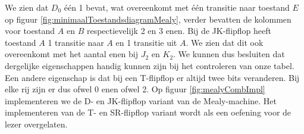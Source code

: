 \begin{table}[hbt]
\centering
{}
\caption{Implementatie van de Mealy-schakeling met verschillende soorten flipflops.}
\end{table}
We zien dat $D_0$ \'e\'en 1 bevat, wat overeenkomt met \'e\'en transitie naar toestand $E$ op figuur \ref{fig:minimaalToestandsdiagramMealy}, verder bevatten de kolommen voor toestand $A$ en $B$ respectievelijk 2 en 3 enen. Bij de JK-flipflop heeft toestand $A$ 1 transitie naar $A$ en 1 transitie uit $A$. We zien dat dit ook overeenkomt met het aantal enen bij $J_2$ en $K_2$. We kunnen dus besluiten dat dergelijke eigenschappen handig kunnen zijn bij het controleren van onze tabel. Een andere eigenschap is dat bij een T-flipflop er altijd twee bits veranderen. Bij elke rij zijn er dus ofwel 0 enen ofwel 2. Op figuur \ref{fig:mealyCombImpl} implementeren we de D- en JK-flipflop variant van de Mealy-machine. Het implementeren van de T- en SR-flipflop variant wordt als een oefening voor de lezer overgelaten.
